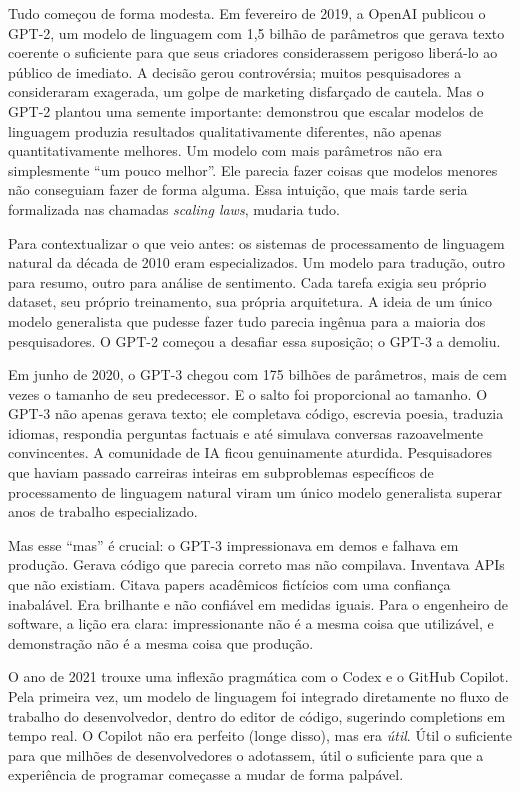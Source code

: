 Tudo começou de forma modesta. Em fevereiro de 2019, a OpenAI publicou
o GPT-2, um modelo de linguagem com 1,5 bilhão de parâmetros que
gerava texto coerente o suficiente para que seus criadores considerassem
perigoso liberá-lo ao público de imediato. A decisão gerou controvérsia;
muitos pesquisadores a consideraram exagerada, um golpe de marketing
disfarçado de cautela. Mas o GPT-2 plantou uma semente importante:
demonstrou que escalar modelos de linguagem produzia resultados
qualitativamente diferentes, não apenas quantitativamente melhores. Um
modelo com mais parâmetros não era simplesmente ``um pouco melhor''.
Ele parecia fazer coisas que modelos menores não conseguiam fazer de
forma alguma. Essa intuição, que mais tarde seria formalizada nas
chamadas \textit{scaling laws}, mudaria tudo.

Para contextualizar o que veio antes: os sistemas de processamento de
linguagem natural da década de 2010 eram especializados. Um modelo para
tradução, outro para resumo, outro para análise de sentimento. Cada
tarefa exigia seu próprio dataset, seu próprio treinamento, sua própria
arquitetura. A ideia de um único modelo generalista que pudesse fazer
tudo parecia ingênua para a maioria dos pesquisadores. O GPT-2
começou a desafiar essa suposição; o GPT-3 a demoliu.

Em junho de 2020, o GPT-3 chegou com 175 bilhões de parâmetros,
mais de cem vezes o tamanho de seu predecessor. E o salto foi
proporcional ao tamanho. O GPT-3 não apenas gerava texto; ele completava
código, escrevia poesia, traduzia idiomas, respondia perguntas factuais
e até simulava conversas razoavelmente convincentes. A comunidade de IA
ficou genuinamente aturdida. Pesquisadores que haviam passado carreiras
inteiras em subproblemas específicos de processamento de linguagem
natural viram um único modelo generalista superar anos de trabalho
especializado.

Mas esse ``mas'' é crucial: o GPT-3 impressionava em demos e
falhava em produção. Gerava código que parecia correto mas não
compilava. Inventava APIs que não existiam. Citava papers acadêmicos
fictícios com uma confiança inabalável. Era brilhante e não confiável
em medidas iguais. Para o engenheiro de software, a lição era clara:
impressionante não é a mesma coisa que utilizável, e demonstração não
é a mesma coisa que produção.

O ano de 2021 trouxe uma inflexão pragmática com o Codex e o GitHub
Copilot. Pela primeira vez, um modelo de linguagem foi integrado
diretamente no fluxo de trabalho do desenvolvedor, dentro do editor de
código, sugerindo completions em tempo real. O Copilot não era perfeito
(longe disso), mas era \textit{útil}. Útil o suficiente para que
milhões de desenvolvedores o adotassem, útil o suficiente para que a
experiência de programar começasse a mudar de forma palpável.

